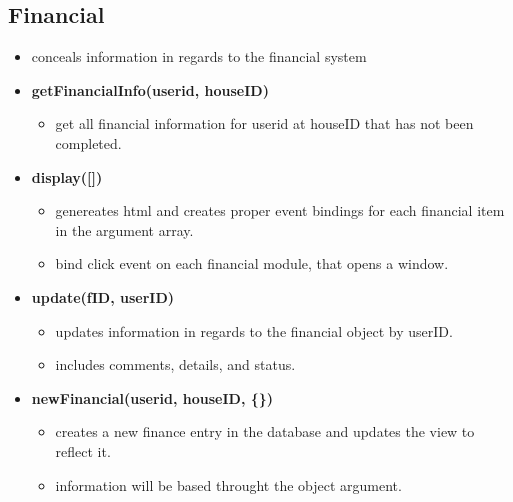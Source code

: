 \documentclass[12pt]{article}
\begin{document}
\subsection{Financial}
\begin{itemize}
  \item conceals information in regards to the financial system
  \item \textbf{getFinancialInfo(userid, houseID)}
    \begin{itemize}
    \item get all financial information for userid at houseID that has not been completed.
    \end{itemize}
  \item \textbf{display([])}
    \begin{itemize}
    \item genereates html and creates proper event bindings for each financial item in the argument array.
    \item bind click event on each financial module, that opens a window.
    \end{itemize}
  \item \textbf{update(fID, userID)}
    \begin{itemize}
    \item updates information in regards to the financial object by userID.
    \item includes comments, details, and status.
    \end{itemize}
  \item \textbf{newFinancial(userid, houseID, \{\})}
    \begin{itemize}
    \item creates a new finance entry in the database and updates the view to reflect it.
    \item information will be based throught the object argument.
    \end{itemize}
\end{itemize}
\end{document}
